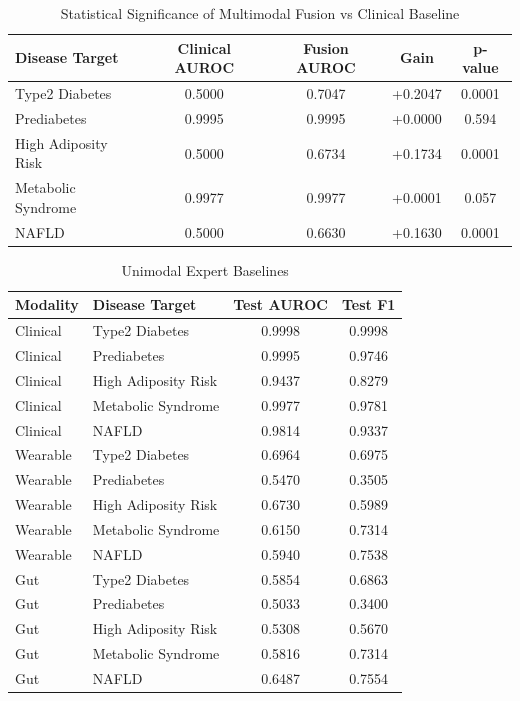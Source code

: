 \begin{table}[htbp]
\caption{Statistical Significance of Multimodal Fusion vs Clinical Baseline}
\begin{center}
\begin{tabular}{|l|c|c|c|c|}
\hline
\textbf{Disease Target} & \textbf{Clinical AUROC} & \textbf{Fusion AUROC} & \textbf{Gain} & \textbf{p-value} \\
\hline
Type2 Diabetes & 0.5000 & 0.7047 & +0.2047 & 0.0001 \\
Prediabetes & 0.9995 & 0.9995 & +0.0000 & 0.594 \\
High Adiposity Risk & 0.5000 & 0.6734 & +0.1734 & 0.0001 \\
Metabolic Syndrome & 0.9977 & 0.9977 & +0.0001 & 0.057 \\
NAFLD & 0.5000 & 0.6630 & +0.1630 & 0.0001 \\
\hline
\end{tabular}
\end{center}
\end{table}


\begin{table}[htbp]
\caption{Unimodal Expert Baselines}
\begin{center}
\begin{tabular}{|l|l|c|c|}
\hline
\textbf{Modality} & \textbf{Disease Target} & \textbf{Test AUROC} & \textbf{Test F1} \\
\hline
Clinical & Type2 Diabetes & 0.9998 & 0.9998 \\
Clinical & Prediabetes & 0.9995 & 0.9746 \\
Clinical & High Adiposity Risk & 0.9437 & 0.8279 \\
Clinical & Metabolic Syndrome & 0.9977 & 0.9781 \\
Clinical & NAFLD & 0.9814 & 0.9337 \\
Wearable & Type2 Diabetes & 0.6964 & 0.6975 \\
Wearable & Prediabetes & 0.5470 & 0.3505 \\
Wearable & High Adiposity Risk & 0.6730 & 0.5989 \\
Wearable & Metabolic Syndrome & 0.6150 & 0.7314 \\
Wearable & NAFLD & 0.5940 & 0.7538 \\
Gut & Type2 Diabetes & 0.5854 & 0.6863 \\
Gut & Prediabetes & 0.5033 & 0.3400 \\
Gut & High Adiposity Risk & 0.5308 & 0.5670 \\
Gut & Metabolic Syndrome & 0.5816 & 0.7314 \\
Gut & NAFLD & 0.6487 & 0.7554 \\
\hline
\end{tabular}
\end{center}
\end{table}
